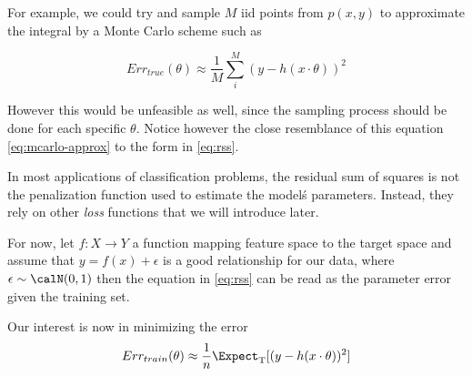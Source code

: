 For example, we could try and sample $M$ iid points from $p(x,y)$ to approximate the integral by a Monte Carlo scheme such as 

\begin{equation} \label{eq:mcarlo-approx}
    Err_{true}(\theta)  \approx \frac{1}{M} \sum_i^M ( y - h(x \cdot \theta) )^2
\end{equation}

However this would be unfeasible as well, since the sampling process should be done for each specific $\theta$. Notice however the close resemblance of this equation \ref{eq:mcarlo-approx} to the form in \ref{eq:rss}. 

In most applications of classification problems, the residual sum of squares is not the penalization function used to estimate the model\'s parameters. Instead, they rely on other \textit{loss} functions that we will introduce later.

For now, let $f: X \rightarrow Y$ a function mapping feature space to the target space and assume that $y  =  f(x)  +  \epsilon $ is a good relationship for our data, where $\epsilon \sim \calN(0,1) $ then the equation in \ref{eq:rss} can be read as the parameter error given the training set.

Our interest is now in minimizing the error
\[
Err_{train}(\theta) \approx \frac{1}{n} \Expect_{ \mathrm{T}}[(y - h(x \cdot \theta) )^2]
\]


